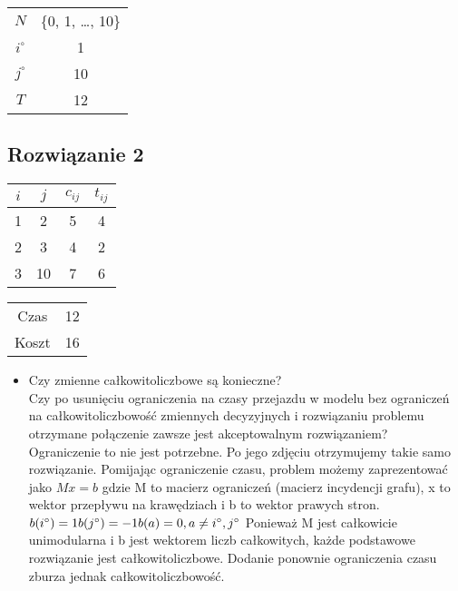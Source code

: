 \documentclass[12pt, letterpaper]{article}
\begin{document}
\begin{center}
  \begin{tabular}{|c|c|}
    \hline
    \( N \)       & \{0, 1, \dots, 10\} \\
    \( i^\circ \) & 1                   \\
    \( j^\circ \) & 10                  \\
    \( T \)       & 12                  \\
    \hline
  \end{tabular}
\end{center}

\subsection{Rozwiązanie 2}

\begin{center}
  \begin{tabular}{|c|c|c|c|}
    \hline
    \( i \) & \( j \) & \( c_{ij} \) & \( t_{ij} \) \\
    \hline
    1       & 2       & 5            & 4            \\
    2       & 3       & 4            & 2            \\
    3       & 10      & 7            & 6            \\
    \hline
  \end{tabular}
\end{center}

\begin{center}
  \begin{tabular}{|c|c|}
    \hline
    Czas  & 12 \\
    Koszt & 16 \\
    \hline
  \end{tabular}
\end{center}

\begin{itemize}
  \item Czy zmienne całkowitoliczbowe są konieczne? \\
        Czy po usunięciu ograniczenia na czasy przejazdu w modelu bez
        ograniczeń na całkowitoliczbowość zmiennych decyzyjnych i rozwiązaniu
        problemu
        otrzymane połączenie zawsze jest akceptowalnym rozwiązaniem? \\
        Ograniczenie to nie jest potrzebne. Po jego zdjęciu otrzymujemy takie
        samo rozwiązanie.
        Pomijając ograniczenie czasu, problem możemy zaprezentować jako $ M
          x = b $
        gdzie M to macierz ograniczeń (macierz incydencji grafu),
        x to wektor przepływu na krawędziach i b to wektor prawych stron.
        $ \\ b(i^\circ) = 1 \\ b(j^\circ) = -1 \\ b(a) = 0, a \neq i^\circ,
          j^\circ \\ $
        Ponieważ M jest całkowicie unimodularna i b jest wektorem liczb
        całkowitych,
        każde podstawowe rozwiązanie jest całkowitoliczbowe.
        Dodanie ponownie ograniczenia czasu zburza jednak całkowitoliczbowość.
\end{itemize}
\end{document}
